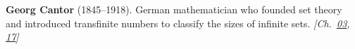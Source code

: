 \textbf{Georg Cantor} (1845–1918). German mathematician who founded set theory and introduced transfinite numbers to classify the sizes of infinite sets. \emph{[Ch.~\hyperref[ch:banach]{03}, \hyperref[ch:bignumbers]{17}]}


